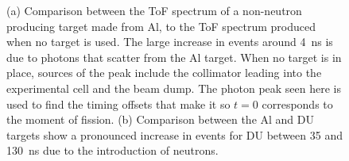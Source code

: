 \begin{figure}[]
\centering
     \figToFNewline
    \caption{(a) Comparison between the ToF spectrum of a non-neutron producing target made from Al, to the ToF spectrum produced when no target is used.
    The large increase in events around 4~ns is due to photons that scatter from the Al target.
    When no target is in place, sources of the peak include the collimator leading into the experimental cell and the beam dump.
    The photon peak seen here is used to find the timing offsets that make it so $t=0$ corresponds to the moment of fission.
    (b) Comparison between the Al and DU targets show a pronounced increase in events for DU between 35 and 130~ns due to the introduction of neutrons.}
    \label{fig:ToF}
\end{figure}

